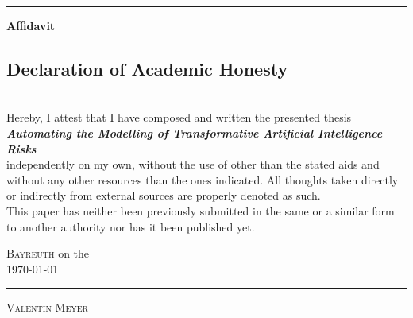 \documentclass[
  11pt,
  letterpaper,
]{book}
\begin{document}
\vspace{1.5cm}
\hrule
\vspace{2.5cm}


  \LARGE\textbf{Affidavit}
\vspace{1.5cm}

\center

\normalsize


    \subsection*{\Large Declaration of Academic Honesty}
	    \vspace{1cm}\noindent \\
	    Hereby, I attest that I have composed and written the presented thesis 
        \vspace*{0.5cm}\noindent \\
        \textit{ \textbf{ Automating the Modelling of Transformative Artificial Intelligence Risks }}
        \vspace*{0.5cm}\noindent \\
        independently on my own, without the use of other than the stated aids and without any other resources than the ones indicated. All thoughts taken directly or indirectly from external sources are properly denoted as such.
	    \vspace{\baselineskip}
	    \\  This paper has neither been previously submitted in the same or a similar form to another authority nor has it been published yet.
	    \vspace{2cm}
	    
    \flushright
    \begin{minipage}{0.5\textwidth}
        \begin{flushleft} \large
        \textsc{Bayreuth}                     %
        on the \\ %
        \today           %
        \vspace{2cm}\\
    	{\rule[-3pt]{\linewidth}{.4pt}\par\smallskip  
        \textsc{Valentin Meyer}	\\         %
    	}
        \end{flushleft}
        \end{minipage}
\end{document}
